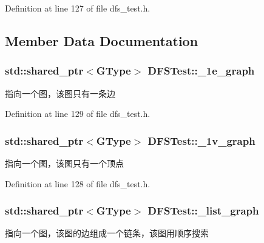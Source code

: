 Definition at line 127 of file dfs\+\_\+test.\+h.



\subsection{Member Data Documentation}
\hypertarget{class_d_f_s_test_ae5351e523345888ffc64aa892d93d3c2}{}
\subsubsection[{\+\_\+1e\+\_\+graph}]{\setlength{\rightskip}{0pt plus 5cm}std\+::shared\+\_\+ptr$<${\bf G\+Type}$>$ D\+F\+S\+Test\+::\+\_\+1e\+\_\+graph\hspace{0.3cm}{\ttfamily [protected]}}\label{class_d_f_s_test_ae5351e523345888ffc64aa892d93d3c2}
指向一个图，该图只有一条边 

Definition at line 129 of file dfs\+\_\+test.\+h.

\hypertarget{class_d_f_s_test_a4dbae7784992bee522457b53da2141c2}{}
\subsubsection[{\+\_\+1v\+\_\+graph}]{\setlength{\rightskip}{0pt plus 5cm}std\+::shared\+\_\+ptr$<${\bf G\+Type}$>$ D\+F\+S\+Test\+::\+\_\+1v\+\_\+graph\hspace{0.3cm}{\ttfamily [protected]}}\label{class_d_f_s_test_a4dbae7784992bee522457b53da2141c2}
指向一个图，该图只有一个顶点 

Definition at line 128 of file dfs\+\_\+test.\+h.

\hypertarget{class_d_f_s_test_a9607eac5350c4cdd449c353fed482efc}{}
\subsubsection[{\+\_\+list\+\_\+graph}]{\setlength{\rightskip}{0pt plus 5cm}std\+::shared\+\_\+ptr$<${\bf G\+Type}$>$ D\+F\+S\+Test\+::\+\_\+list\+\_\+graph\hspace{0.3cm}{\ttfamily [protected]}}\label{class_d_f_s_test_a9607eac5350c4cdd449c353fed482efc}
指向一个图，该图的边组成一个链条，该图用顺序搜索 

